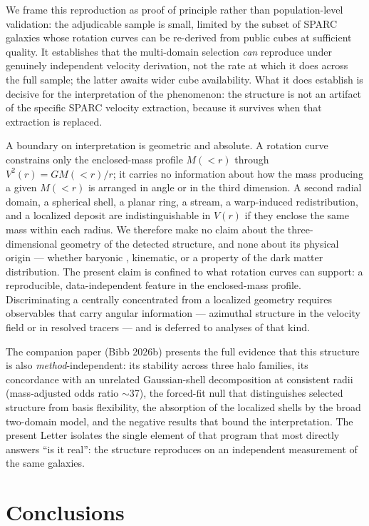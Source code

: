 \documentclass[twocolumn]{aastex701}
\begin{document}
We frame this reproduction as proof of principle rather than population-level
validation: the adjudicable sample is small, limited by the subset of SPARC
galaxies whose rotation curves can be re-derived from public cubes at sufficient
quality. It establishes that the multi-domain selection \emph{can} reproduce under
genuinely independent velocity derivation, not the rate at which it does across
the full sample; the latter awaits wider cube availability. What it does establish
is decisive for the interpretation of the phenomenon: the structure is not an
artifact of the specific SPARC velocity extraction, because it survives when that
extraction is replaced.

A boundary on interpretation is geometric and absolute. A rotation curve
constrains only the enclosed-mass profile $M({<}r)$ through $V^2(r) = G
M({<}r)/r$; it carries no information about how the mass producing a given
$M({<}r)$ is arranged in angle or in the third dimension. A second radial domain,
a spherical shell, a planar ring, a stream, a warp-induced redistribution, and a
localized deposit are indistinguishable in $V(r)$ if they enclose the same mass
within each radius. We therefore make no claim about the three-dimensional
geometry of the detected structure, and none about its physical origin --- whether
baryonic \citep[e.g.\ features propagated from the gas disk;][]{Sancisi2004},
kinematic, or a property of the dark matter distribution. The present claim is
confined to what rotation curves can support: a reproducible, data-independent
feature in the enclosed-mass profile. Discriminating a centrally concentrated from
a localized geometry requires observables that carry angular information ---
azimuthal structure in the velocity field or in resolved tracers --- and is
deferred to analyses of that kind.

The companion paper (Bibb 2026b) presents the full evidence that this structure is
also \emph{method}-independent: its stability across three halo families, its
concordance with an unrelated Gaussian-shell decomposition at consistent radii
(mass-adjusted odds ratio $\sim$37), the forced-fit null that distinguishes
selected structure from basis flexibility, the absorption of the localized shells
by the broad two-domain model, and the negative results that bound the
interpretation. The present Letter isolates the single element of that program
that most directly answers ``is it real'': the structure reproduces on an
independent measurement of the same galaxies.

\section{Conclusions} \label{sec:conclusions}
\end{document}
